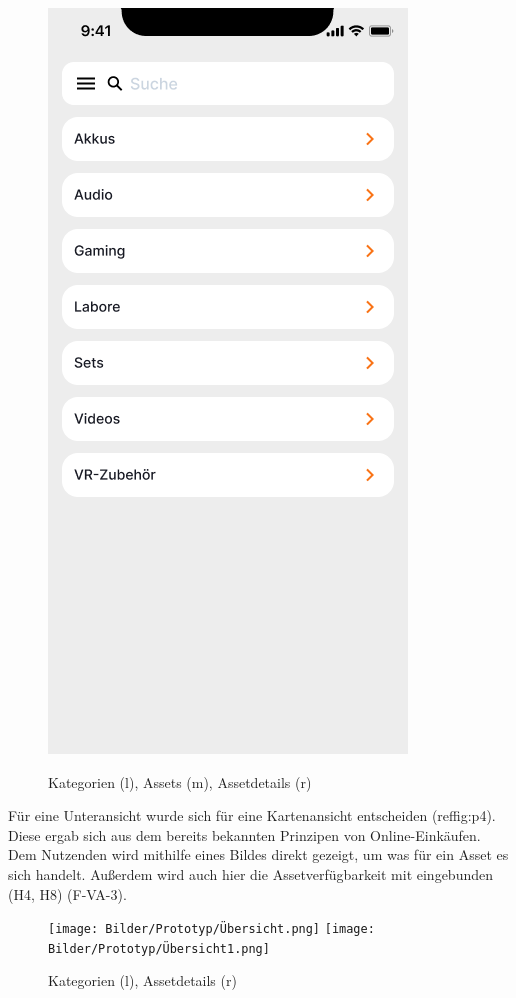 \begin{figure}[h]
    \includegraphics[scale=0.3]{Bilder/Prototyp/Neu/Kategorein 1.png}
    \label{fig:p1}
    \caption[Mockup: Kategorien, Assets, Assetdetails]{Kategorien (l), Assets (m), Assetdetails (r)}
\end{figure}

Für eine Unteransicht wurde sich für eine Kartenansicht entscheiden (ref{fig:p4}). Diese ergab sich aus dem 
bereits bekannten Prinzipen von Online-Einkäufen. Dem Nutzenden wird mithilfe eines Bildes direkt
gezeigt, um was für ein Asset es sich handelt. Außerdem wird auch hier die Assetverfügbarkeit mit
eingebunden (H4, H8) (F-VA-3).

\begin{figure}[h]
    \centering
    \texttt{[image: Bilder/Prototyp/Übersicht.png]}\hspace{2em}
    \texttt{[image: Bilder/Prototyp/Übersicht1.png]}
    \label{fig:p4}
    \caption[Mockup: Kategorien, Assets, Assetdetails]{Kategorien (l), Assetdetails (r)}
\end{figure}



